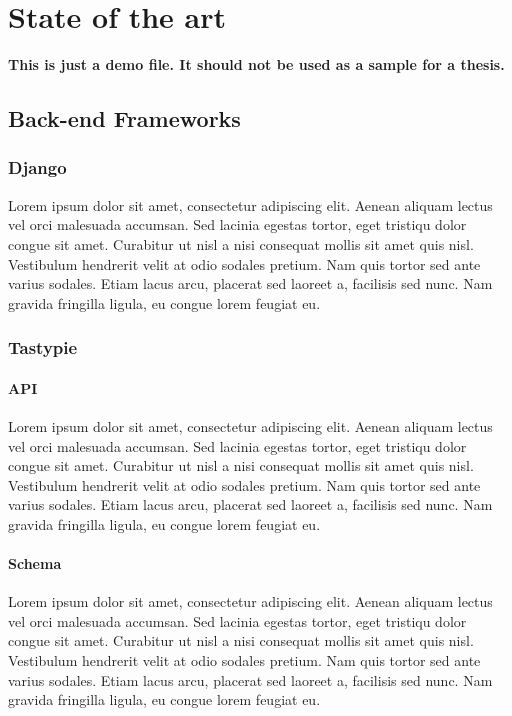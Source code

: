 \chapter{State of the art}
\label{chapter:state}

\textbf{This is just a demo file. It should not be used as a sample for a thesis.}\\

\section{Back-end Frameworks}
\label{sec:backend}

\subsection{Django}
\label{sub-sec:django}

Lorem ipsum dolor sit amet, consectetur adipiscing elit. Aenean aliquam lectus vel orci malesuada accumsan. Sed lacinia egestas tortor, eget tristiqu dolor congue sit amet. Curabitur ut nisl a nisi consequat mollis sit amet quis nisl. Vestibulum hendrerit velit at odio sodales pretium. Nam quis tortor sed ante varius sodales. Etiam lacus arcu, placerat sed laoreet a, facilisis sed nunc. Nam gravida fringilla ligula, eu congue lorem feugiat eu.


\subsection{Tastypie}
\label{sub-sec:tastypie}

\subsubsection{API}

Lorem ipsum dolor sit amet, consectetur adipiscing elit. Aenean aliquam lectus vel orci malesuada accumsan. Sed lacinia egestas tortor, eget tristiqu dolor congue sit amet. Curabitur ut nisl a nisi consequat mollis sit amet quis nisl. Vestibulum hendrerit velit at odio sodales pretium. Nam quis tortor sed ante varius sodales. Etiam lacus arcu, placerat sed laoreet a, facilisis sed nunc. Nam gravida fringilla ligula, eu congue lorem feugiat eu.

\subsubsection{Schema}

Lorem ipsum dolor sit amet, consectetur adipiscing elit. Aenean aliquam lectus vel orci malesuada accumsan. Sed lacinia egestas tortor, eget tristiqu dolor congue sit amet. Curabitur ut nisl a nisi consequat mollis sit amet quis nisl. Vestibulum hendrerit velit at odio sodales pretium. Nam quis tortor sed ante varius sodales. Etiam lacus arcu, placerat sed laoreet a, facilisis sed nunc. Nam gravida fringilla ligula, eu congue lorem feugiat eu.


